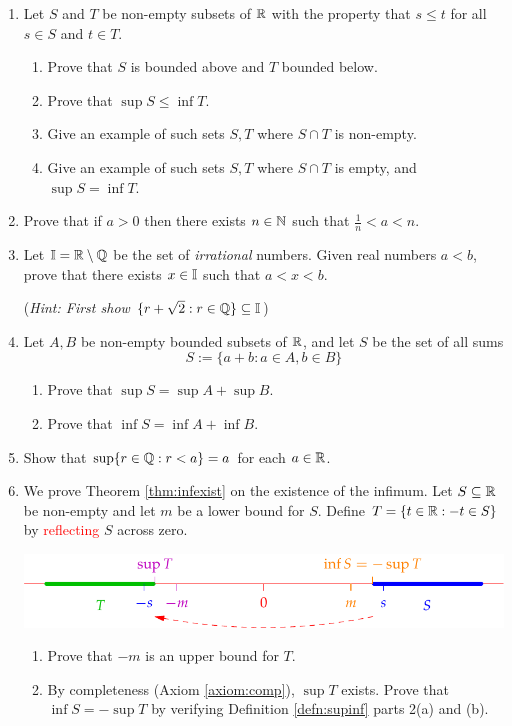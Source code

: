 \begin{exercises}{}{}
\begin{enumerate}
  
  	\goodbreak
  
  
	  \item %
	  Let $S$ and $T$ be non-empty subsets of $\mathbb{R}$ with the property that $s\le t$ for all $s\in S$ and $t\in T$.
	  \begin{enumerate}
		  \item Prove that $S$ is bounded above and $T$ bounded below.
		  \item Prove that $\sup S\le \inf T$.
		  \item Give an example of such sets $S,T$ where $S\cap T$ is non-empty.
		  \item Give an example of such sets $S,T$ where $S\cap T$ is empty, and $\sup S=\inf T$.
	  \end{enumerate}
  
  
	  \item %
	  Prove that if $a>0$ then there exists $n\in\mathbb{N}$ such that $\frac 1n<a<n$.
	  
	
	  \item%
	  \label{exs:irrdense} Let $\mathbb{I}=\mathbb{R}\setminus\mathbb{Q}$ be the set of \emph{irrational} numbers. Given real numbers $a<b$, prove that there exists $x\in\mathbb{I}$ such that $a<x<b$.\par
	  (\emph{Hint: First show $\{r+\sqrt 2:r\in\mathbb{Q}\}\subseteq\mathbb{I}$})
  

  	\item %
  	Let $A, B$ be non-empty bounded subsets of $\mathbb{R}$, and let $S$ be the set of all sums
  	\[
  		S:=\{a+b:a\in A,b\in B\}
  	\]
	  \begin{enumerate}
		  \item Prove that $\sup S=\sup A+\sup B$.
		  \item Prove that $\inf S=\inf A+\inf B$.
	  \end{enumerate}
  

  	\item%
  	Show that $\sup\{r\in \mathbb{Q}:r<a\}=a$ for each $a\in\mathbb{R}$.
  
  
  	\item\label{exs:infexist} We prove Theorem \ref{thm:infexist} on the existence of the infimum.\smallbreak
	  Let $S\subseteq\mathbb{R}$ be non-empty and let $m$ be a lower bound for $S$. Define $T=\{t\in\mathbb{R}:-t\in S\}$ by \textcolor{red}{reflecting} $S$ across zero.
		\begin{center}
			\includegraphics{infexist2}
		\end{center}
		\begin{enumerate}
		  \item Prove that $-m$ is an upper bound for $T$.
			\item By completeness (Axiom \ref{axiom:comp}), $\sup T$ exists. Prove that $\inf S=-\sup T$ by verifying Definition \ref{defn:supinf} parts 2(a) and (b).
		\end{enumerate}
  
	\end{enumerate}
\end{exercises}


